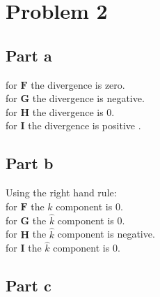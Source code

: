 \documentclass{article}
\begin{document}
\section{Problem 2}
\subsection{Part a}
for $\mathbf{F}$ the divergence is zero.\\
for $\mathbf{G}$ the divergence is negative.\\
for $\mathbf{H}$ the divergence is 0.\\
for $\mathbf{I}$ the divergence is positive .\\

\subsection{Part b}
Using the right hand rule:\\
for $\mathbf{F}$ the $\hat{k}$ component is 0.\\
for $\mathbf{G}$ the $\hat{k}$ component is 0.\\
for $\mathbf{H}$ the $\hat{k}$ component is negative.\\
for $\mathbf{I}$ the $\hat{k}$ component is 0.\\
\subsection{Part c}
\end{document}
